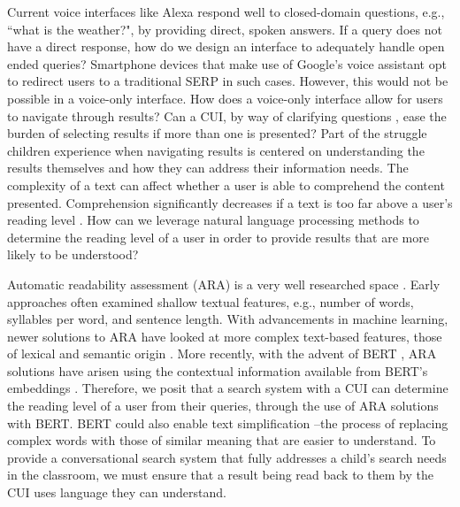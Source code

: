 \documentclass{sigchi-ext}
\begin{document}
Current voice interfaces like Alexa respond well to closed-domain questions, e.g., ``what is the weather?", by providing direct, spoken answers. If a query does not have a direct response, how do we design an interface to adequately handle open ended queries? Smartphone devices that make use of Google's voice assistant opt to redirect users to a traditional SERP in such cases. However, this would not be possible in a voice-only interface. How does a voice-only interface allow for users to navigate through results? Can a CUI, by way of clarifying questions \cite{krasakis2020analysing}, ease the burden of selecting results if more than one is presented? Part of the struggle children experience when navigating results is centered on understanding the results themselves and how they can address their information needs. The complexity of a text can affect whether a user is able to comprehend the content presented. Comprehension significantly decreases if a text is too far above a user's reading level \cite{amendum2016push,amendum2018does}. How can we leverage natural language processing methods to determine the reading level of a user in order to provide results that are more likely to be understood? 

Automatic readability assessment (ARA) is a very well researched space \cite{dubay2007smart}. Early approaches often examined shallow textual features, e.g., number of words, syllables per word, and sentence length. With advancements in machine learning, newer solutions to ARA have looked at more complex text-based features, those of lexical and semantic origin \cite{cha2017language,chen2018word}. More recently, with the advent of BERT \cite{devlin2018bert}, ARA solutions have arisen using the contextual information available from BERT's embeddings \cite{imperial2021knowledge}. Therefore, we posit that a search system with a CUI can determine the reading level of a user from their queries, through the use of ARA solutions with BERT. 
BERT could also enable text simplification \cite{sabharwal2021bert,qiang2020lexical}--the process of replacing complex words with those of similar meaning that are easier to understand. To provide a conversational search system that fully addresses a child's search needs in the classroom, we must ensure that a result being read back to them by the CUI uses language they can understand. 
\end{document}
